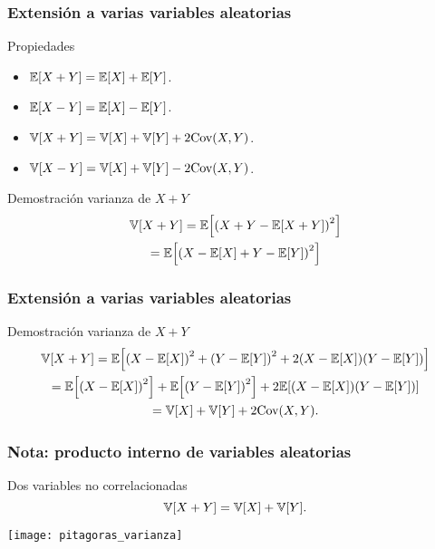 \documentclass[table]{beamer}
\begin{document}
\begin{frame}
    \frametitle{Extensión a varias variables aleatorias}
    \begin{block}{Propiedades}
        \begin{itemize}
            \item $\expected{X + Y} = \expected{X} + \expected{Y}$.
            \item $\expected{X - Y} = \expected{X} - \expected{Y}$.
            \item $\variance{X + Y} = \variance{X} + \variance{Y} + 2 \cov{X , Y}$.
            \item $\variance{X - Y} = \variance{X} + \variance{Y} - 2 \cov{X , Y}$.
        \end{itemize}
    \end{block}
    \begin{block}{Demostración varianza de $X + Y$}
        \begin{multline*}
            \variance{X + Y}
            = \expected{\parens{X + Y - \expected{X + Y}}^{2}}
            \\
            = \expected{\parens{X - \expected{X} + Y - \expected{Y}}^{2}}
        \end{multline*}
    \end{block}
\end{frame}


\begin{frame}
    \frametitle{Extensión a varias variables aleatorias}
    
    \begin{block}{Demostración varianza de $X + Y$}
        \begin{multline*}
             \variance{X + Y}
            = \expected{\parens{X - \expected{X}}^{2} + \parens{Y - \expected{Y}}^{2} + 2 \parens{X - \expected{X}} \parens{Y - \expected{Y}}}
            \\
            = \expected{\parens{X - \expected{X}}^{2}} + \expected{\parens{Y - \expected{Y}}^{2}} + 2 \expected{\parens{X - \expected{X}} \parens{Y - \expected{Y}}}
            \\
            = \variance{X} + \variance{Y} + 2 \cov{X , Y} .
        \end{multline*}
    \end{block}
\end{frame}

\begin{frame}
    \frametitle{Nota: producto interno de variables aleatorias}
    \begin{block}{Dos variables no correlacionadas}
        \begin{equation*}
            \variance{X + Y} = \variance{X} + \variance{Y} .
        \end{equation*}
    \end{block}
    \begin{center}
        \texttt{[image: pitagoras\_varianza]}
    \end{center}
\end{frame}
\end{document}
